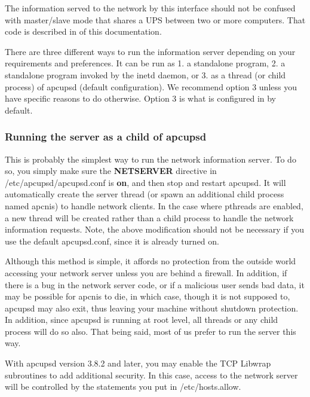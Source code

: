 {{{{{{{{{{The information served to the network by this interface should not be confused
with master/slave mode that shares a UPS between two or more computers. That
code is described in 
 of this
documentation.  

There are three different ways to run the information server depending on your
requirements and preferences. It can be run as 1.  a standalone program, 2. a
standalone program invoked by the inetd daemon, or 3. as a thread (or child
process) of apcupsd (default configuration). We recommend option 3 unless you
have specific reasons to do otherwise. Option 3 is what is configured in by
default. 

\label{Running-the-server-as-a-child-of-apcupsd}

\subsubsection*{Running the server as a child of apcupsd}

This is probably the simplest way to run the network information server. To do
so, you simply make sure the {\bf NETSERVER} directive in
/etc/apcupsd/apcupsd.conf is {\bf on}, and then stop and restart apcupsd. It
will automatically create the server thread (or spawn an additional child
process named apcnis) to handle network clients. In the case where pthreads
are enabled, a new thread will be created rather than a child process to
handle the network information requests. Note, the above modification should
not be necessary if you use the default apcupsd.conf, since it is already
turned on.  

Although this method is simple, it affords no protection from the outside
world accessing your network server unless you are behind a firewall. In
addition, if there is a bug in the network server code, or if a malicious user
sends bad data, it may be possible for apcnis to die, in which case, though it
is not supposed to, apcupsd may also exit, thus leaving your machine without
shutdown protection. In addition, since apcupsd is running at root level, all
threads or any child process will do so also. That being said, most of us
prefer to run the server this way.  

With apcupsd version 3.8.2 and later, you may enable the TCP Libwrap
subroutines to add additional security. In this case, access to the network
server will be controlled by the statements you put in /etc/hosts.allow. 

}}}}}}}}}}
